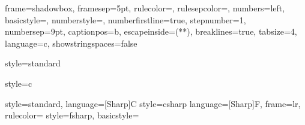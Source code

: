
% 
% 

%

\makeatletter
\let\cref@old@stepcounter\stepcounter
\def\stepcounter#1{%
  \cref@old@stepcounter{#1}%
  \cref@constructprefix{#1}{\cref@result}%
  \@ifundefined{cref@#1@alias}%
    {\def\@tempa{#1}}%
    {\def\@tempa{\csname cref@#1@alias\endcsname}}%
  \protected@edef\cref@currentlabel{%
    [\@tempa][\arabic{#1}][\cref@result]%
    \csname p@#1\endcsname\csname the#1\endcsname}}
\makeatother
%

\renewcommand\lstlistingname{Kodeeksempel}
\renewcommand\lstlistlistingname{Kodeeksempel}

{
	frame=shadowbox,
	framesep=5pt,
	rulecolor=\color{blue!40!black},
	rulesepcolor=\color{white!93!black},
	numbers=left,
	basicstyle=\ttfamily,
	numberstyle=\tiny,
	numberfirstline=true,
	stepnumber=1,
	numbersep=9pt,	
	captionpos=b,
	escapeinside={(*}{*)},
	breaklines=true,
	tabsize=4,
	language=c,
	showstringspaces=false
}

\lstset{style=standard}

{
	style=standard
}

{
	style=c
}

{
	style=standard,
	language=[Sharp]C
}
{
	style=csharp
}
{
	language=[Sharp]F,
	frame=lr,
	rulecolor=\color{blue!80!black}
}
{
	style=fsharp,
	basicstyle=\ttfamily\footnotesize
}

